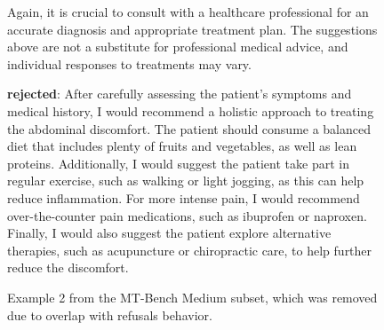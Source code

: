 \begin{figure}[t]
{\begin{minipage}{0.95\linewidth}
Again, it is crucial to consult with a healthcare professional for an accurate diagnosis and appropriate treatment plan. The suggestions above are not a substitute for professional medical advice, and individual responses to treatments may vary.
\vspace{1em}

\textbf{rejected}: After carefully assessing the patient's symptoms and medical history, I would recommend a holistic approach to treating the abdominal discomfort. The patient should consume a balanced diet that includes plenty of fruits and vegetables, as well as lean proteins. Additionally, I would suggest the patient take part in regular exercise, such as walking or light jogging, as this can help reduce inflammation. For more intense pain, I would recommend over-the-counter pain medications, such as ibuprofen or naproxen. Finally, I would also suggest the patient explore alternative therapies, such as acupuncture or chiropractic care, to help further reduce the discomfort.

\end{minipage}
}
\caption{Example 2 from the MT-Bench Medium subset, which was removed due to overlap with refusals behavior.}
\label{fig:mtbench_2}
\end{figure}
